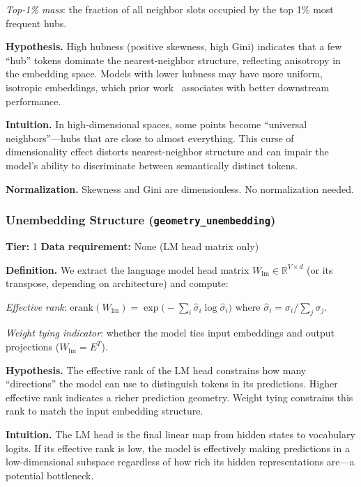 \documentclass[preprint]{neurips_2025}
\begin{document}
\emph{Top-1\% mass}: the fraction of all neighbor slots occupied by the top 1\% most frequent hubs.

\textbf{Hypothesis.}
High hubness (positive skewness, high Gini) indicates that a few ``hub'' tokens dominate the nearest-neighbor structure, reflecting anisotropy in the embedding space. Models with lower hubness may have more uniform, isotropic embeddings, which prior work~\citep{cai2021isotropy} associates with better downstream performance.

\textbf{Intuition.}
In high-dimensional spaces, some points become ``universal neighbors''---hubs that are close to almost everything. This curse of dimensionality effect distorts nearest-neighbor structure and can impair the model's ability to discriminate between semantically distinct tokens.

\textbf{Normalization.} Skewness and Gini are dimensionless. No normalization needed.

\subsubsection{Unembedding Structure (\texttt{geometry\_unembedding})}
\label{app:unembedding}

\textbf{Tier:} 1 \quad \textbf{Data requirement:} None (LM head matrix only)

\textbf{Definition.}
We extract the language model head matrix $W_{\text{lm}} \in \mathbb{R}^{V \times d}$ (or its transpose, depending on architecture) and compute:

\emph{Effective rank}: $\text{erank}(W_{\text{lm}}) = \exp\!\bigl(-\sum_i \hat\sigma_i \log \hat\sigma_i\bigr)$ where $\hat\sigma_i = \sigma_i / \sum_j \sigma_j$.

\emph{Weight tying indicator}: whether the model ties input embeddings and output projections ($W_{\text{lm}} = E^T$).

\textbf{Hypothesis.}
The effective rank of the LM head constrains how many ``directions'' the model can use to distinguish tokens in its predictions. Higher effective rank indicates a richer prediction geometry. Weight tying constrains this rank to match the input embedding structure.

\textbf{Intuition.}
The LM head is the final linear map from hidden states to vocabulary logits. If its effective rank is low, the model is effectively making predictions in a low-dimensional subspace regardless of how rich its hidden representations are---a potential bottleneck.
\end{document}
